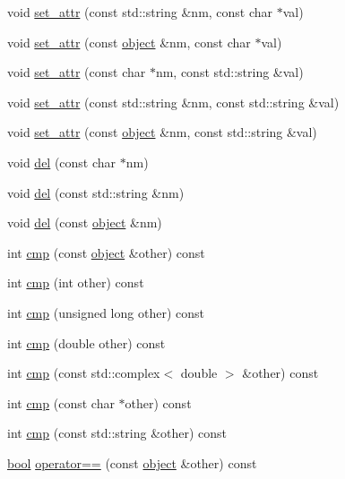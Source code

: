 \begin{DoxyCompactItemize}
void \hyperlink{classpy_1_1object_ab167c2fe8b306b08584f1d544c8b2e49}{set\+\_\+attr} (const std\+::string \&nm, const char $\ast$val)
\item 
void \hyperlink{classpy_1_1object_a2248737e349ec569a4a6750889540902}{set\+\_\+attr} (const \hyperlink{classpy_1_1object}{object} \&nm, const char $\ast$val)
\item 
void \hyperlink{classpy_1_1object_a06c414cdb4d6dbddc94f05a55c5f3732}{set\+\_\+attr} (const char $\ast$nm, const std\+::string \&val)
\item 
void \hyperlink{classpy_1_1object_a196d8cb24ce4915a6424331e9e900ceb}{set\+\_\+attr} (const std\+::string \&nm, const std\+::string \&val)
\item 
void \hyperlink{classpy_1_1object_a2b7d0bbbdabe10cdc8b704d9321541ce}{set\+\_\+attr} (const \hyperlink{classpy_1_1object}{object} \&nm, const std\+::string \&val)
\item 
void \hyperlink{classpy_1_1object_a3a945fec732b87a37c8b7ab7d3517cf1}{del} (const char $\ast$nm)
\item 
void \hyperlink{classpy_1_1object_a070fae6f957fabd063bfbc502b4a9e66}{del} (const std\+::string \&nm)
\item 
void \hyperlink{classpy_1_1object_af1bdb69075d2748b0717de51606f8a7d}{del} (const \hyperlink{classpy_1_1object}{object} \&nm)
\item 
int \hyperlink{classpy_1_1object_a9f95c4c3257d24c14d786c12061217d5}{cmp} (const \hyperlink{classpy_1_1object}{object} \&other) const 
\item 
int \hyperlink{classpy_1_1object_acd6a86b32f2c62fb449772b71e3922f9}{cmp} (int other) const 
\item 
int \hyperlink{classpy_1_1object_a0b573e5c3510f12cc3c5be4ab6a86651}{cmp} (unsigned long other) const 
\item 
int \hyperlink{classpy_1_1object_a89f6ee72eb8eb91e210d16721524445f}{cmp} (double other) const 
\item 
int \hyperlink{classpy_1_1object_a657aad1ef6356b1db84da5335f500e23}{cmp} (const std\+::complex$<$ double $>$ \&other) const 
\item 
int \hyperlink{classpy_1_1object_a5acd0970dcaae57ea13b95590cc830fb}{cmp} (const char $\ast$other) const 
\item 
int \hyperlink{classpy_1_1object_aefe60595e3de66139213fb132beec77a}{cmp} (const std\+::string \&other) const 
\item 
\hyperlink{compiler_8h_abb452686968e48b67397da5f97445f5b}{bool} \hyperlink{classpy_1_1object_a305c4223554bd80d97c444d351ee8ee8}{operator==} (const \hyperlink{classpy_1_1object}{object} \&other) const 

\end{DoxyCompactItemize}
